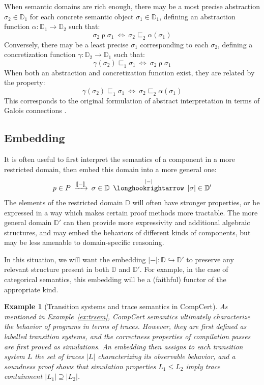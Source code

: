 \documentclass[11pt,oneside,draft]{book}
\newtheorem{example}[theorem]{Example}
\theoremstyle{definition}
\newcommand{\refby}{\sqsubseteq} %
\begin{document}
When semantic domains are rich enough,
there may be a most precise
abstraction $\sigma_2 \in \mathbb{D}_1$
for each concrete semantic object
$\sigma_1 \in \mathbb{D}_1$,
defining an abstraction function
$\alpha : \mathbb{D}_1 \rightarrow \mathbb{D}_2$
such that:
\[
  \sigma_2 \mathrel{\rho} \sigma_1
  \: \Leftrightarrow \:
  \sigma_2 \refby_2 \alpha(\sigma_1)
\]
Conversely,
there may be a least precise $\sigma_1$
corresponding to each $\sigma_2$,
defining
a concretization function
$\gamma : \mathbb{D}_2 \rightarrow \mathbb{D}_1$
such that:
\[
  \gamma(\sigma_2) \refby_1 \sigma_1
  \: \Leftrightarrow \:
  \sigma_2 \mathrel{\rho} \sigma_1
\]
When both an abstraction and concretization function exist,
they are related by the property:
\[
  \gamma(\sigma_2) \refby_1 \sigma_1
  \: \Leftrightarrow \:
  \sigma_2 \refby_2 \alpha(\sigma_1)
\]
This corresponds to
the original formulation of abstract interpretation \citep{absint}
in terms of Galois connections \citep{pgc}.


\subsection{Embedding} \label{sec:bg:embed} %

It is often useful to first interpret the semantics of a component
in a more restricted domain,
then embed this domain into a more general one:
\[
    p \in P
    \: \xrightarrow{\llbracket - \rrbracket} \:
    \sigma \in \mathbb{D}
    \: \stackrel{|-|}{\longhookrightarrow} \:
    |\sigma| \in \mathbb{D}'
\]
The elements of the restricted domain $\mathbb{D}$
will often have stronger properties,
or be expressed in a way which makes certain
proof methods more tractable.
The more general domain $\mathbb{D}'$
can then provide more expressivity
and additional algebraic structures,
and may embed the behaviors of different kinds of components,
but may be less amenable to domain-specific reasoning.

In this situation,
we will want the embedding
$|-| : \mathbb{D} \hookrightarrow \mathbb{D}'$
to preserve any relevant structure present in both
$\mathbb{D}$ and $\mathbb{D}'$.
For example,
in the case of categorical semantics,
this embedding will be a (faithful) functor
of the appropriate kind.

\begin{example}[Transition systems and trace semantics in CompCert] %
As mentioned in Example~\ref{ex:trsem},
CompCert semantics
ultimately characterize the behavior of programs
in terms of traces.
However,
they are first defined as labelled transition systems,
and the correctness properties of compilation passes
are first proved as simulations.
An embedding then assigns to each transition system $L$
the set of traces $|L|$ characterizing
its observable behavior,
and a soundness proof shows that
simulation properties $L_1 \le L_2$
imply trace containment $|L_1| \supseteq |L_2|$.
\end{example}
\end{document}
